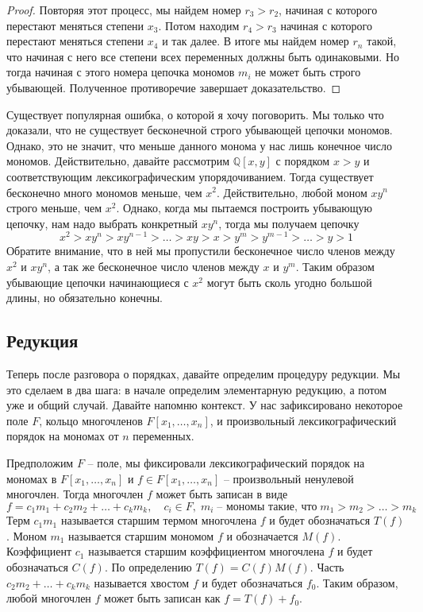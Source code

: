 \begin{proof}
Повторяя этот процесс, мы найдем номер $r_3 > r_2$, начиная с которого перестают меняться степени $x_3$.
Потом находим $r_4>r_3$ начиная с которого перестают меняться степени $x_4$ и так далее.
В итоге мы найдем номер $r_n$ такой, что начиная с него все степени всех переменных должны быть одинаковыми.
Но тогда начиная с этого номера цепочка мономов $m_i$ не может быть строго убывающей.
Полученное противоречие завершает доказательство.
\end{proof}

\begin{remark}
Существует популярная ошибка, о которой я хочу поговорить.
Мы только что доказали, что не существует бесконечной строго убывающей цепочки мономов.
Однако, это не значит, что меньше данного монома у нас лишь конечное число мономов.
Действительно, давайте рассмотрим $\mathbb Q[x, y]$ с порядком $x > y$ и соответствующим лексикографическим упорядочиванием.
Тогда существует бесконечно много мономов меньше, чем $x^2$.
Действительно, любой моном $xy^n$ строго меньше, чем $x^2$.
Однако, когда мы пытаемся построить убывающую цепочку, нам надо выбрать конкретный $xy^n$, тогда мы получаем цепочку
\[
x^2 > xy^n > xy^{n-1} > \ldots > xy > x > y^m > y^{m-1} > \ldots > y > 1
\]
Обратите внимание, что в ней мы пропустили бесконечное число членов между $x^2$ и $xy^n$, а так же бесконечное число членов между $x$ и $y^m$.
Таким образом убывающие цепочки начинающиеся с $x^2$ могут быть сколь угодно большой длины, но обязательно конечны.
\end{remark}

\subsection{Редукция}

Теперь после разговора о порядках, давайте определим процедуру редукции.
Мы это сделаем в два шага: в начале определим элементарную редукцию, а потом уже и общий случай.
Давайте напомню контекст.
У нас зафиксировано некоторое поле $F$, кольцо многочленов $F[x_1,\ldots,x_n]$, и произвольный лексикографический порядок на мономах от $n$ переменных.

\begin{definition}
\label{def::LeadingTerm}
Предположим $F$ -- поле, мы фиксировали лексикографический порядок на мономах в $F[x_1,\ldots,x_n]$ и $f\in F[x_1,\ldots,x_n]$ -- произвольный ненулевой многочлен.
Тогда многочлен $f$ может быть записан в виде
\[
f = c_1 m_1 + c_2 m_2 + \ldots + c_k m_k,\quad c_i\in F,\;m_i\;\text{-- мономы такие, что}\; m_1 > m_2 >\ldots>m_k
\]
Терм $c_1m_1$ называется старшим термом многочлена $f$ и будет обозначаться $T(f)$.
Моном $m_1$ называется старшим мономом $f$ и обозначается $M(f)$.
Коэффициент $c_1$ называется старшим коэффициентом многочлена $f$ и будет обозначаться $C(f)$.
По определению $T(f) = C(f) M(f)$.
Часть $c_2m_2 + \ldots + c_k m_k$ называется хвостом $f$ и будет обозначаться $f_0$.
Таким образом, любой многочлен $f$ может быть записан как $f = T(f) + f_0$.
\end{definition}

